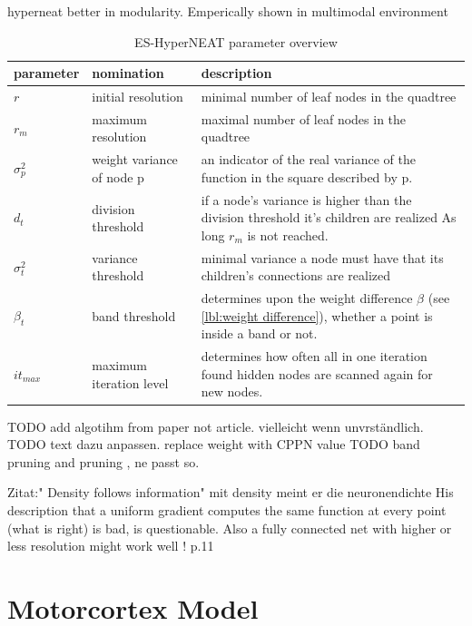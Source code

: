 hyperneat better in modularity. Emperically shown in multimodal environment

\begin{table}[h]

\begin{tabular}{ l | l | l }		
	parameter & nomination & description \\
	\hline
	$r$ & initial resolution & minimal number of leaf nodes in the quadtree \\
	$r_m$ & maximum resolution & maximal number of leaf nodes in the quadtree  \\
	$\sigma^2_p$ &  weight variance of node p & an indicator of the real variance of the function in the square described by p.\\
    $d_t$ & division threshold& if a node's variance is higher than the division threshold it's children are realized As long $r_m$ is not reached.\\ 
	$\sigma^2_t$&variance threshold& minimal variance a node must have that its children's connections are realized\\ 
    $\beta_t$& band threshold & determines upon the weight difference $\beta$ (see \ref{lbl:weight difference}), whether a point is inside a band or not.\\
    $it_{max}$&maximum iteration level& determines how often all in one iteration found hidden nodes are scanned again for new nodes.
\end{tabular}
\caption[ES-HyperNEAT parameter overview ]{ES-HyperNEAT parameter overview}
\label{table:ES-HYPERNAET-Params}
\end{table}

TODO add algotihm from paper not article. vielleicht wenn unvrständlich.
TODO text dazu anpassen.  replace weight with CPPN value
TODO band pruning and pruning , ne passt so.

Zitat:"
Density
follows information" mit density meint er die neuronendichte
His description that a uniform gradient computes the same function at every point (what is right) is bad, is questionable. Also a fully connected net with higher or less resolution might work well !  p.11



\section{Motorcortex Model}\label{MotorCortex_Model}